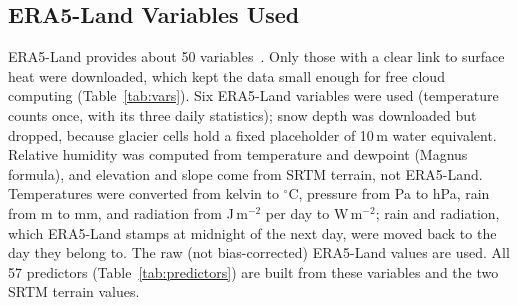 \documentclass[12pt,a4paper]{report}
\begin{document}
\subsection{ERA5-Land Variables Used}
ERA5-Land provides about 50 variables~\cite{munoz2021era5land}. Only those with a clear link to surface heat were
downloaded, which kept the data small enough for free cloud computing (Table~\ref{tab:vars}). Six ERA5-Land variables were used
(temperature counts once, with its three daily statistics); snow depth was downloaded but dropped, because glacier cells hold a fixed placeholder of 10\,m water equivalent.
Relative humidity was computed from temperature and dewpoint (Magnus formula), and elevation and slope come from SRTM
terrain, not ERA5-Land. Temperatures were converted from
kelvin to $^\circ$C, pressure from Pa to hPa, rain from m to mm, and radiation from J\,m$^{-2}$ per day to
W\,m$^{-2}$; rain and radiation, which ERA5-Land stamps at midnight of the next day, were moved back to the day they
belong to. The raw (not bias-corrected) ERA5-Land values are used. All 57 predictors
(Table~\ref{tab:predictors}) are built from these variables and the two SRTM terrain values.
\end{document}
